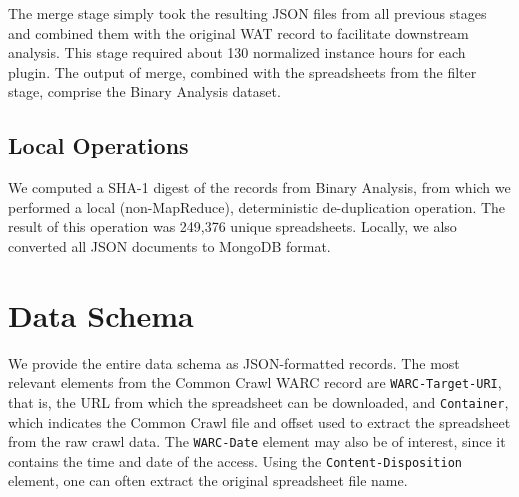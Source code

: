 \documentclass[conference]{IEEEtran}
\begin{document}
The merge stage simply took the resulting JSON files from all previous stages and combined them with the original WAT record to facilitate downstream analysis. This stage required about 130 normalized instance hours for each plugin. The output of merge, combined with the spreadsheets from the filter stage, comprise the Binary Analysis dataset.

\subsection{Local Operations}


We computed a SHA-1 digest of the records from Binary Analysis, from which we performed a local (non-MapReduce), deterministic de-duplication operation. The result of this operation was 249,376 unique spreadsheets. Locally, we also converted all JSON documents to MongoDB format.







\section{Data Schema}
\label{sec:schema}


We provide the entire data schema as JSON-formatted records. The most relevant elements from the Common Crawl WARC record are \texttt{WARC-Target-URI}, that is, the URL from which the spreadsheet can be downloaded, and \texttt{Container}, which indicates the Common Crawl file and offset used to extract the spreadsheet from the raw crawl data. The \texttt{WARC-Date} element may also be of interest, since it contains the time and date of the access. Using the \texttt{Content-Disposition} element, one can often extract the original spreadsheet file name.
\end{document}
